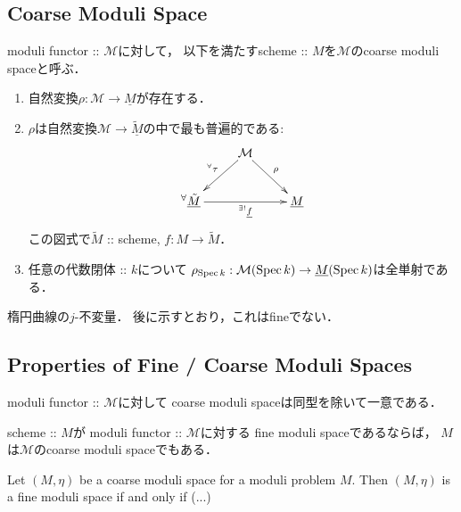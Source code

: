\documentclass[a4paper]{jsarticle}
\newcommand{\func}[1]{\underline{#1}}
\newcommand{\ftorM}{\mathcal{M}}
\begin{document}
    \subsection{Coarse Moduli Space}
    \begin{Def}
        moduli functor :: $\ftorM$に対して，
        以下を満たすscheme :: $M$を$\ftorM$のcoarse moduli spaceと呼ぶ．
        \begin{enumerate}[label=(\roman*), leftmargin=*]
            \item
                自然変換$\rho: \ftorM \to \func{M}$が存在する．
            \item
                $\rho$は自然変換$\ftorM \to \func{\tilde{M}}$の中で最も普遍的である:
                \[
                \xymatrix
                {
                    {} & \ar[ld]_-{{}^{\forall} \tau}\ftorM \ar[rd]^-{\rho}& {} \\
                    {}^{\forall}\func{\tilde{M}} \ar[rr]_-{{}^{\exists!} \func{f}}& {} & \func{M}
                }
                \]
                この図式で$\tilde{M}$ :: scheme, $f: M \to \tilde{M}$．
            \item
                任意の代数閉体 :: $k$について
                $\rho_{\Spec k}: \ftorM(\Spec k) \to \func{M}(\Spec k)$は全単射である．
        \end{enumerate}
    \end{Def}

    \begin{Example}
        楕円曲線の$j$-不変量．
        後に示すとおり，これはfineでない．
    \end{Example}

    \subsection{Properties of Fine / Coarse Moduli Spaces}
    \begin{Prop}
        moduli functor :: $\ftorM$に対して
        coarse moduli spaceは同型を除いて一意である．
    \end{Prop}

    \begin{Prop}
        scheme :: $M$が
        moduli functor :: $\ftorM$に対する
        fine moduli spaceであるならば，
        $M$は$\ftorM$のcoarse moduli spaceでもある．
    \end{Prop}
    
    \begin{Prop}
     Let $(M, \eta)$ be a coarse moduli space for a moduli problem $M$.
     Then $(M, \eta)$ is a fine moduli space if and only if (...)
    \end{Prop}
\end{document}
